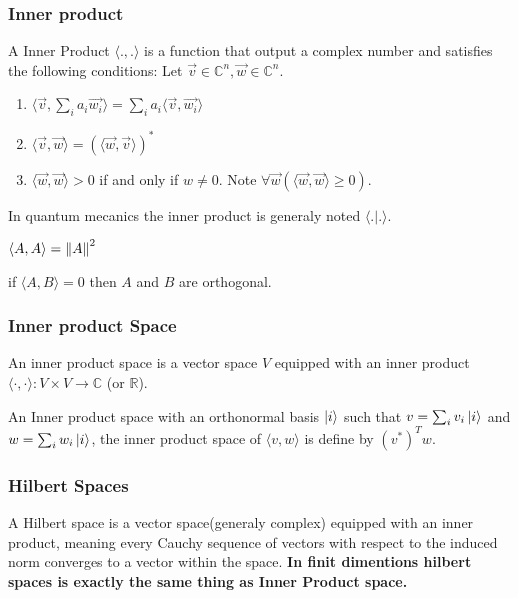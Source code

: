 \documentclass[5pt]{article}
\begin{document}
\begin{multicols}{3}
\subsubsection{Inner product}
A Inner Product $\langle.,.\rangle$ is a function that output a complex number and satisfies the following conditions: Let $\vec{v}\in\mathbb{C}^n, \vec{w}\in\mathbb{C}^n$.
\begin{enumerate}
     \item $\langle \vec{v},\sum_ia_i\vec{w_i}\rangle=\sum_ia_i\langle \vec{v},\vec{w_i}\rangle$
     \item $\langle \vec{v},\vec{w}\rangle=(\langle \vec{w},\vec{v}\rangle)^*$
     \item $\langle \vec{w},\vec{w}\rangle> 0$  if and only if $w\neq0$. Note $\forall \vec{w}(\langle \vec{w},\vec{w}\rangle\geq 0)$.
\end{enumerate}
In quantum mecanics the inner product is generaly noted $\langle.|.\rangle$.

\begin{properties}
     \begin{itemize*}
          \item $\langle A,A\rangle=\norm{A}^2$
          \item if $\langle A,B\rangle=0$ then $A$ and $B$ are orthogonal.      
     \end{itemize*}
\end{properties}

\subsubsection{Inner product Space}

An inner product space is a vector space $V$ equipped with an inner product $\langle\cdot,\cdot\rangle : V \times V \to \mathbb{C}$ (or $\mathbb{R}$).

An Inner product space with an orthonormal basis $\ket{i}$ such that $v=\sum_iv_i\ket{i}$ and $w=\sum_iw_i\ket{i}$, the inner product space of $\langle v,w \rangle$ is define by $(v^*)^Tw$.

 
\subsubsection{Hilbert Spaces}
A Hilbert space is a vector space(generaly complex) equipped with an inner product, 
meaning every Cauchy sequence of vectors with respect to the induced norm converges to a vector within the space.
\textbf{In finit dimentions hilbert spaces is exactly the same thing as Inner Product space.}



\end{multicols}
\end{document}
